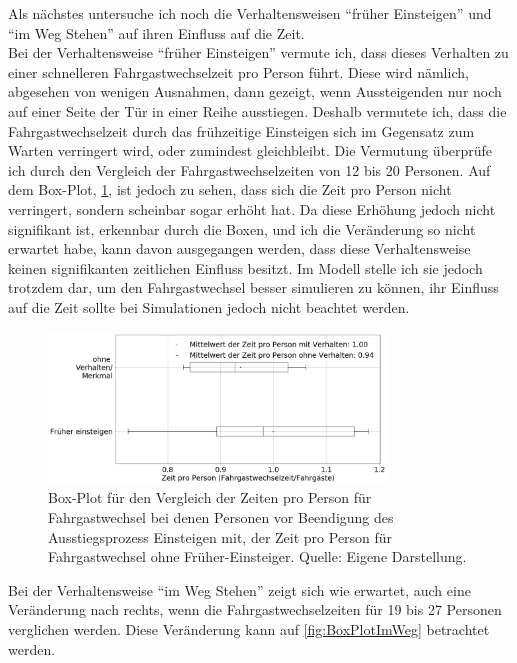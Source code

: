 Als nächstes untersuche ich noch die Verhaltensweisen "`früher Einsteigen"' und "`im Weg Stehen"' auf ihren Einfluss auf die Zeit.\\
Bei der Verhaltensweise "`früher Einsteigen"' vermute ich, dass dieses Verhalten zu einer schnelleren Fahrgastwechselzeit pro Person führt. Diese wird nämlich, abgesehen von wenigen Ausnahmen, dann gezeigt, wenn Aussteigenden nur noch auf einer Seite der Tür in einer Reihe ausstiegen. Deshalb vermutete ich, dass die Fahrgastwechselzeit durch das frühzeitige Einsteigen sich im Gegensatz zum Warten verringert wird, oder zumindest gleichbleibt. Die Vermutung überprüfe ich durch den Vergleich der Fahrgastwechselzeiten von 12 bis 20 Personen. Auf dem Box-Plot, \figurename \ref{fig:BoxPlotFrueherEinsteigen}, ist jedoch zu sehen, dass sich die Zeit pro Person nicht verringert, sondern scheinbar sogar erhöht hat. Da diese Erhöhung jedoch nicht signifikant ist, erkennbar durch die Boxen, und ich die Veränderung so nicht erwartet habe, kann davon ausgegangen werden, dass diese Verhaltensweise keinen signifikanten zeitlichen Einfluss besitzt. Im Modell stelle ich sie jedoch trotzdem dar, um den Fahrgastwechsel besser simulieren zu können, ihr Einfluss auf die Zeit sollte bei Simulationen jedoch nicht beachtet werden.
\begin{figure}[H]
	\centering
		\includegraphics[width=0.8\textwidth]{pictures/data_evaluation/behavior/comp_Fruehereinsteigen.png}
	\caption{Box-Plot für den Vergleich der Zeiten pro Person für Fahrgastwechsel bei denen Personen vor Beendigung des Ausstiegsprozess Einsteigen mit, der Zeit pro Person für Fahrgastwechsel ohne Früher-Einsteiger. Quelle: Eigene Darstellung.}
	\label{fig:BoxPlotFrueherEinsteigen}
\end{figure}
Bei der Verhaltensweise "`im Weg Stehen"' zeigt sich wie erwartet, auch eine Veränderung nach rechts, wenn die Fahrgastwechselzeiten für 19 bis 27 Personen verglichen werden. Diese Veränderung kann auf \figurename \ref{fig:BoxPlotImWeg} betrachtet werden.
